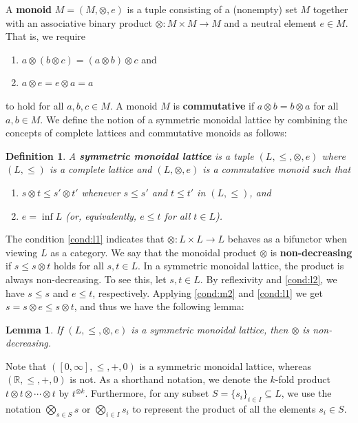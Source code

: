 \documentclass[a4paper,11pt]{article}
\newcommand{\tensor}{\otimes}
\newcommand{\bigtensor}{\bigotimes}
\newcounter{dummy}\numberwithin{dummy}{section}
\newtheorem{lemma}[dummy]{Lemma}
\newtheorem{definition}[dummy]{Definition}
\theoremstyle{remark}
\begin{document}
A \textbf{monoid} $M=(M,\tensor,e)$ is a tuple consisting of a (nonempty) set $M$ together with an associative binary product $\tensor\colon M\times M\to M$ and a neutral element $e\in M$. That is, we require
\begin{enumerate}[label=(M\arabic{*}), ref=(M\arabic{*}),leftmargin=5.0em]
    \item\label{cond:m1} $a\tensor(b\tensor c)=(a\tensor b)\tensor c$ and
    \item\label{cond:m2} $a\tensor e=e\tensor a=a$
\end{enumerate}
to hold for all $a,b,c\in M$. A monoid $M$ is \textbf{commutative} if $a\tensor b=b\tensor a$ for all $a,b\in M$. We define the notion of a symmetric monoidal lattice by combining the concepts of complete lattices and commutative monoids as follows:
\begin{definition}
A \textbf{symmetric monoidal lattice} is a tuple $(L, \leq, \tensor, e)$ where $(L,\leq)$ is a complete lattice and $(L,\tensor,e)$ is a commutative monoid such that
\begin{enumerate}[label=(SML\arabic{*}), ref=(SML\arabic{*}),leftmargin=5.0em]
    \item\label{cond:l1} $s\tensor t\leq s'\tensor t'$ whenever $s\leq s'$ and $t\leq t'$ in $(L,\leq)$, and
    \item\label{cond:l2} $e=\inf L$ (or, equivalently, $e\leq t$ for all $t\in L$).
\end{enumerate}
\end{definition}

The condition \ref{cond:l1} indicates that $\tensor\colon L\times L\to L$ behaves as a bifunctor when viewing $L$ as a category. We say that the monoidal product $\tensor$ is \textbf{non-decreasing} if $s\leq s\tensor t$ holds for all $s,t\in L$. In a symmetric monoidal lattice, the product is always non-decreasing. To see this, let $s,t\in L$. By reflexivity and \ref{cond:l2}, we have $s\leq s$ and $e\leq t$, respectively. Applying \ref{cond:m2} and \ref{cond:l1} we get $s=s\tensor e\leq s\tensor t$, and thus we have the following lemma:
\begin{lemma}\label{lem:monoidal_product_is_non_decreasing}
If $(L,\leq,\tensor,e)$ is a symmetric monoidal lattice, then $\tensor$ is non-decreasing.
\end{lemma}

Note that $([0,\infty],\leq,+,0)$ is a symmetric monoidal lattice, whereas $(\mathbb{R},\leq,+,0)$ is not. As a shorthand notation, we denote the $k$-fold product $t\tensor t\tensor\cdots\tensor t$ by $t^{\tensor k}$. Furthermore, for any subset $S=\{s_i\}_{i\in I}\subseteq L$, we use the notation $\bigtensor_{s\in S}s$ or $\bigtensor_{i\in I}s_i$ to represent the product of all the elements $s_i\in S$. 
\end{document}
